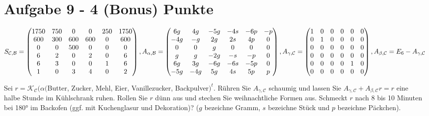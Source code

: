\section*{Aufgabe 9 - 4 (Bonus) Punkte}
    $S_{\mathcal{C},\mathcal{B}} = \begin{pmatrix}
    1750 & 750 & 0&0&250&1750\\
    600&300&600&600&0&600\\
    0&0&500&0&0&0\\
    6&2&0&2&0&6\\
    6&3&0&0&1&6\\
    1&0&3&4&0&2
    \end{pmatrix}, A_{\alpha,\mathcal{B}} = \begin{pmatrix}
    6g&4g&-5g&-4s&-6p&-p\\
    -4g&-g&2g&2s&4p&0\\
    0&0&g&0&0&0\\
    g&g&-2g&-s&-p&0\\
    6g&3g&-6g&-6s&-5p&0\\
    -5g&-4g&5g&4s&5p&p
    \end{pmatrix},\\
     A_{\gamma,\mathcal{C}} = \begin{pmatrix}
    1&0&0&0&0&0\\
    0&1&0&0&0&0\\
    0&0&0&0&0&0\\
    0&0&0&0&0&0\\
    0&0&0&0&1&0\\
    0&0&0&0&0&0\\
    \end{pmatrix},
    A_{\beta,\mathcal{C}} = E_6 - A_{\gamma,\mathcal{C}} $

    Sei $r = \mathcal{K}_{\mathcal{C}}(\alpha($Butter, Zucker, Mehl, Eier, Vanillezucker, Backpulver$)^t$. Rühren Sie $A_{\gamma,\mathcal{C}}$ schaumig und lassen Sie $A_{\gamma,\mathcal{C}} + A_{\beta,\mathcal{C}} r = r$ eine halbe Stunde im Kühlschrank ruhen. Rollen
    Sie $r$ dünn aus und stechen Sie weihnachtliche Formen aus.
    Schmeckt $r$ nach 8 bis 10 Minuten bei 180° im Backofen (ggf. mit Kuchenglasur und Dekoration)?
    ($g$ bezeichne Gramm, $s$ bezeichne Stück und $p$ bezeichne Päckchen).


